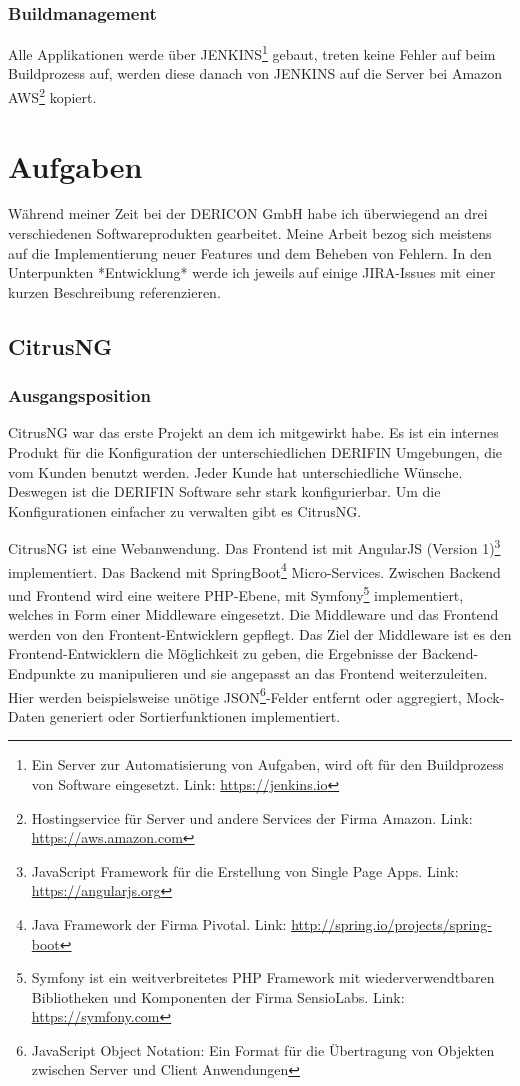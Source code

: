 \documentclass[chapterprefix=false, 12pt, a4paper, oneside, parskip=half, listof=totoc, bibliography=totoc, numbers=noendperiod]{scrbook}
\begin{document}
    \subsection{Buildmanagement}

    Alle Applikationen werde über JENKINS\footnote{Ein Server zur Automatisierung von Aufgaben, wird oft für den Buildprozess von Software eingesetzt. Link: \url{https://jenkins.io}} gebaut,
    treten keine Fehler auf beim Buildprozess auf, werden diese danach von JENKINS auf die Server bei Amazon AWS\footnote{Hostingservice für Server und andere Services der Firma Amazon. Link: \url{https://aws.amazon.com}} kopiert.

    \chapter{Aufgaben}

    Während meiner Zeit bei der DERICON GmbH habe ich überwiegend an drei verschiedenen Softwareprodukten gearbeitet.
    Meine Arbeit bezog sich meistens auf die Implementierung neuer Features und dem Beheben von Fehlern. In den Unterpunkten *Entwicklung*
    werde ich jeweils auf einige JIRA-Issues mit einer kurzen Beschreibung referenzieren.

    \section{CitrusNG}

    \subsection{Ausgangsposition}

    CitrusNG war das erste Projekt an dem ich mitgewirkt habe. Es ist ein internes Produkt für die Konfiguration der unterschiedlichen DERIFIN Umgebungen, die
    vom Kunden benutzt werden. Jeder Kunde hat unterschiedliche Wünsche. Deswegen ist die DERIFIN Software sehr stark konfigurierbar.
    Um die Konfigurationen einfacher zu verwalten gibt es CitrusNG.

    CitrusNG ist eine Webanwendung. Das Frontend ist mit AngularJS (Version 1)\footnote{JavaScript Framework für die Erstellung von
    Single Page Apps. Link: \url{https://angularjs.org}} implementiert.
    Das Backend mit SpringBoot\footnote{Java Framework der Firma Pivotal. Link: \url{http://spring.io/projects/spring-boot}} Micro-Services.
    Zwischen Backend und Frontend wird eine weitere PHP-Ebene, mit Symfony\footnote{Symfony ist ein weitverbreitetes
    PHP Framework mit wiederverwendtbaren Bibliotheken und Komponenten der Firma SensioLabs. Link: \url{https://symfony.com}}
    implementiert, welches in Form einer Middleware eingesetzt. Die Middleware und das Frontend werden von den Frontent-Entwicklern gepflegt.
    Das Ziel der Middleware ist es den Frontend-Entwicklern die Möglichkeit zu geben, die Ergebnisse der
    Backend-Endpunkte zu manipulieren und sie angepasst an das Frontend weiterzuleiten. 
    Hier werden beispielsweise unötige JSON\footnote{JavaScript Object Notation: Ein Format für die Übertragung von
    Objekten zwischen Server und Client Anwendungen}-Felder entfernt oder
    aggregiert, Mock-Daten generiert oder Sortierfunktionen implementiert.
\end{document}

